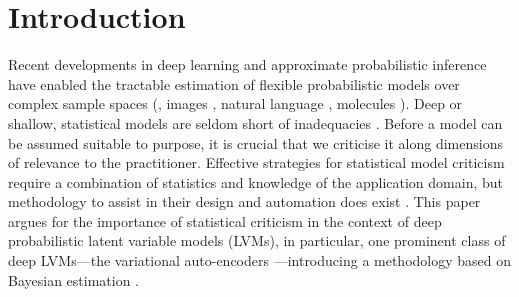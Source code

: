 
\section{Introduction}\label{sec:intro}

Recent developments in 
 deep learning and approximate probabilistic inference \citep{mnih2014neural,TitsiasL14,Kingma+2014:VAE} 
have enabled the tractable estimation of flexible probabilistic models over complex sample spaces (\eg, images \citep{kingma2016improved}, natural language \citep{bowman2015generating}, molecules \citep{simonovsky2018graphvae}). 
Deep or shallow, statistical models are seldom short of inadequacies \citep{theis2015note}. Before a model can be assumed suitable to purpose, it is crucial that we criticise it along dimensions of relevance to the practitioner. 
Effective strategies for statistical model criticism \citep{box1980sampling} require a combination of statistics and knowledge of the application domain, but  methodology to assist in their design and automation does exist \citep{LloydEtAl2015}.  
This paper argues for the importance of statistical criticism in the context of deep probabilistic latent variable models (LVMs), in particular, one prominent class of deep LVMs---the variational auto-encoders \citep[VAEs;][]{Kingma+2014:VAE}---introducing  a methodology based on Bayesian estimation \citep{kruschke2013bayesian}. 

